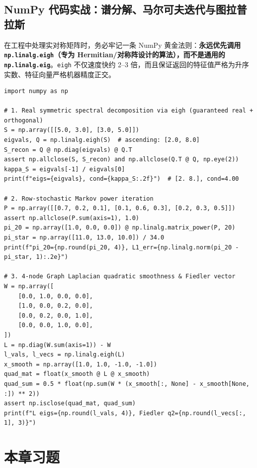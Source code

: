\subsection{NumPy 代码实战：谱分解、马尔可夫迭代与图拉普拉斯}

在工程中处理实对称矩阵时，务必牢记一条 NumPy 黄金法则：\textbf{永远优先调用 \texttt{np.linalg.eigh}（专为 Hermitian/对称阵设计的算法），而不是通用的 \texttt{np.linalg.eig}}。\texttt{eigh} 不仅速度快约 2--3 倍，而且保证返回的特征值严格为升序实数、特征向量严格机器精度正交。

\begin{lstlisting}[caption={实对称谱分解（\texttt{eigh}）、行随机阵平稳分布与图拉普拉斯平滑度验证},label={lst:ch3-verify}]
import numpy as np

# 1. Real symmetric spectral decomposition via eigh (guaranteed real + orthogonal)
S = np.array([[5.0, 3.0], [3.0, 5.0]])
eigvals, Q = np.linalg.eigh(S)  # ascending: [2.0, 8.0]
S_recon = Q @ np.diag(eigvals) @ Q.T
assert np.allclose(S, S_recon) and np.allclose(Q.T @ Q, np.eye(2))
kappa_S = eigvals[-1] / eigvals[0]
print(f"eigs={eigvals}, cond={kappa_S:.2f}")  # [2. 8.], cond=4.00

# 2. Row-stochastic Markov power iteration
P = np.array([[0.7, 0.2, 0.1], [0.1, 0.6, 0.3], [0.2, 0.3, 0.5]])
assert np.allclose(P.sum(axis=1), 1.0)
pi_20 = np.array([1.0, 0.0, 0.0]) @ np.linalg.matrix_power(P, 20)
pi_star = np.array([11.0, 13.0, 10.0]) / 34.0
print(f"pi_20={np.round(pi_20, 4)}, L1_err={np.linalg.norm(pi_20 - pi_star, 1):.2e}")

# 3. 4-node Graph Laplacian quadratic smoothness & Fiedler vector
W = np.array([
    [0.0, 1.0, 0.0, 0.0],
    [1.0, 0.0, 0.2, 0.0],
    [0.0, 0.2, 0.0, 1.0],
    [0.0, 0.0, 1.0, 0.0],
])
L = np.diag(W.sum(axis=1)) - W
l_vals, l_vecs = np.linalg.eigh(L)
x_smooth = np.array([1.0, 1.0, -1.0, -1.0])
quad_mat = float(x_smooth @ L @ x_smooth)
quad_sum = 0.5 * float(np.sum(W * (x_smooth[:, None] - x_smooth[None, :]) ** 2))
assert np.isclose(quad_mat, quad_sum)
print(f"L eigs={np.round(l_vals, 4)}, Fiedler q2={np.round(l_vecs[:, 1], 3)}")
\end{lstlisting}

\section{本章习题}
\label{sec:ch3-exercises}


